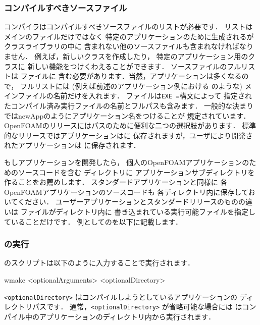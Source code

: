 \subsubsection{コンパイルすべきソースファイル}
\label{sssec:3.2.2.3}
コンパイラはコンパイルすべきソースファイルのリストが必要です．
リストはメインのファイルだけではなく
特定のアプリケーションのために生成されるがクラスライブラリの中に
含まれない他のソースファイルも含まれなければなりません．
例えば，新しいクラスを作成したり，
特定のアプリケーション用のクラスに
新しい機能をつけくわえることができます．
ソースファイルのフルリストは
%
%
ファイルに
含む必要があります．当然，アプリケーションは多くなるので，
フルリストには (例えば前述のアプリケーション例における
のような) メインファイルの名前だけを入れます．
ファイルは\verb|EXE =|構文によって
指定されたコンパイル済み実行ファイルの名前とフルパスも含みます．
一般的な決まりではnewAppのようにアプリケーション名をつけることが
規定されています．
OpenFOAMのリリースにはパスのために便利な二つの選択肢があります．
標準的なリリースではアプリケーションはに
保存されますが，ユーザにより開発されたアプリケーションは
に保存されます．

もしアプリケーションを開発したら，
個人のOpenFOAMアプリケーションのためのソースコードを含む
ディレクトリに
アプリケーションサブディレクトリを作ることをお薦めします．
スタンダードアプリケーションと同様に
各OpenFOAMアプリケーションのソースコードも
各ディレクトリ内に保存しておいてください．
ユーザーアプリケーションとスタンダードリリースのものの違いは
ファイルがディレクトリ内に
書き込まれている実行可能ファイルを指定していることだけです．
例としてのを以下に記載します．

\subsubsection{の実行}
\label{sssec:3.2.2.4}
のスクリプトは以下のように入力することで実行されます．
\begin{OFverbatim}[terminal]
wmake <optionalArguments> <optionalDirectory>
\end{OFverbatim}
\texttt{<optionalDirectory>} はコンパイルしようとしているアプリケーションの
ディレクトリパスです．
通常，\texttt{<optionalDirectory>} が省略可能な場合には
はコンパイル中のアプリケーションのディレクトリ内から実行されます．


